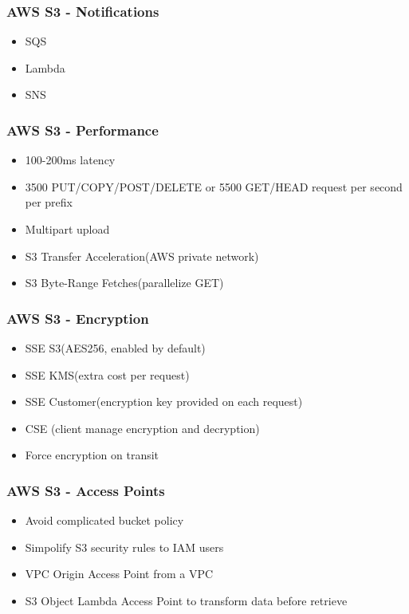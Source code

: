 \documentclass[../main.tex]{subfiles}
\begin{document}
\subsubsection{AWS S3 - Notifications}
\begin{itemize}
    \item SQS
    \item Lambda
    \item SNS
\end{itemize}

\subsubsection{AWS S3 - Performance}
\begin{itemize}
    \item 100-200ms latency
    \item 3500 PUT/COPY/POST/DELETE or 5500 GET/HEAD request per second per prefix
    \item Multipart upload
    \item S3 Transfer Acceleration(AWS private network)
    \item S3 Byte-Range Fetches(parallelize GET)
\end{itemize}

\subsubsection{AWS S3 - Encryption}
\begin{itemize}
    \item SSE S3(AES256, enabled by default)
    \item SSE KMS(extra cost per request)
    \item SSE Customer(encryption key provided on each request)
    \item CSE (client manage encryption and decryption)
    \item Force encryption on transit
\end{itemize}

\subsubsection{AWS S3 - Access Points}
\begin{itemize}
    \item Avoid complicated bucket policy
    \item Simpolify S3 security rules to IAM users
    \item VPC Origin Access Point from a VPC
    \item S3 Object Lambda Access Point to transform data before retrieve
\end{itemize}
\end{document}
